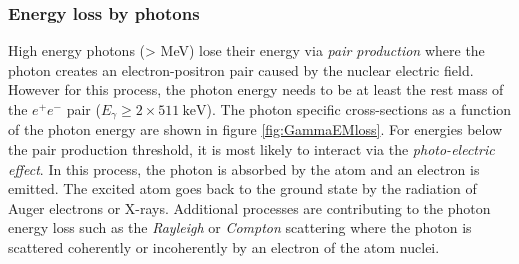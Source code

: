 \subsubsection{Energy loss by photons}

High energy photons (> MeV) lose their energy via \textit{pair production} where the photon creates an electron-positron pair caused by the nuclear electric field. However for this process, the photon energy needs to be at least the rest mass of the $e^+e^-$ pair ($E_{\gamma} \geq 2 \times \SI{511}{\kilo\eV}$). The photon specific cross-sections as a function of the photon energy are shown in figure \ref{fig:GammaEMloss}. For energies below the pair production threshold, it is most likely to interact via the \textit{photo-electric effect}. In this process, the photon is absorbed by the atom and an electron is emitted. The excited atom goes back to the ground state by the radiation of Auger electrons or X-rays. Additional processes are contributing to the photon energy loss such as the \textit{Rayleigh} or \textit{Compton} scattering where the photon is scattered coherently or incoherently by an electron of the atom nuclei.

